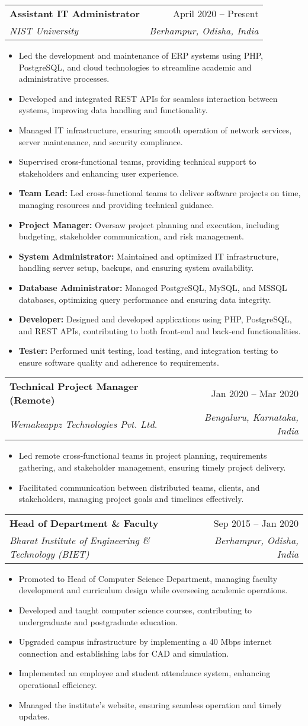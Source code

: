 \documentclass[letterpaper,11pt]{article}
\makeatletter
\newcommand{\resumeItem}[1]{
  \item\small{
    {#1 \vspace{-2pt}}
  }
}
\newcommand{\resumeSubheading}[4]{
  \vspace{-2pt}\item
    \begin{tabular*}{0.97\textwidth}[t]{l@{\extracolsep{\fill}}r}
      \textbf{#1} & #2 \\
      \textit{\small#3} & \textit{\small #4} \\
    \end{tabular*}\vspace{-7pt}
}
\newcommand{\resumeItemListStart}{\begin{itemize}}
\newcommand{\resumeItemListEnd}{\end{itemize}\vspace{-5pt}}
\makeatother
\begin{document}
\resumeSubheading
{Assistant IT Administrator}{April 2020 -- Present}
{NIST University}{Berhampur, Odisha, India}
\resumeItemListStart
    \resumeItem{Led the development and maintenance of ERP systems using PHP, PostgreSQL, and cloud technologies to streamline academic and administrative processes.}
    \resumeItem{Developed and integrated REST APIs for seamless interaction between systems, improving data handling and functionality.}
    \resumeItem{Managed IT infrastructure, ensuring smooth operation of network services, server maintenance, and security compliance.}
    \resumeItem{Supervised cross-functional teams, providing technical support to stakeholders and enhancing user experience.}
    \resumeItem{\textbf{Team Lead:} Led cross-functional teams to deliver software projects on time, managing resources and providing technical guidance.}
    \resumeItem{\textbf{Project Manager:} Oversaw project planning and execution, including budgeting, stakeholder communication, and risk management.}
    \resumeItem{\textbf{System Administrator:} Maintained and optimized IT infrastructure, handling server setup, backups, and ensuring system availability.}
    \resumeItem{\textbf{Database Administrator:} Managed PostgreSQL, MySQL, and MSSQL databases, optimizing query performance and ensuring data integrity.}
    \resumeItem{\textbf{Developer:} Designed and developed applications using PHP, PostgreSQL, and REST APIs, contributing to both front-end and back-end functionalities.}
    \resumeItem{\textbf{Tester:} Performed unit testing, load testing, and integration testing to ensure software quality and adherence to requirements.}
\resumeItemListEnd

\resumeSubheading
{Technical Project Manager (Remote)}{Jan 2020 -- Mar 2020}
{Wemakeappz Technologies Pvt. Ltd.}{Bengaluru, Karnataka, India}
\resumeItemListStart
    \resumeItem{Led remote cross-functional teams in project planning, requirements gathering, and stakeholder management, ensuring timely project delivery.}
    \resumeItem{Facilitated communication between distributed teams, clients, and stakeholders, managing project goals and timelines effectively.}
\resumeItemListEnd

\resumeSubheading
{Head of Department \& Faculty}{Sep 2015 -- Jan 2020}
{Bharat Institute of Engineering \& Technology (BIET)}{Berhampur, Odisha, India}
\resumeItemListStart
    \resumeItem{Promoted to Head of Computer Science Department, managing faculty development and curriculum design while overseeing academic operations.}
    \resumeItem{Developed and taught computer science courses, contributing to undergraduate and postgraduate education.}
    \resumeItem{Upgraded campus infrastructure by implementing a 40 Mbps internet connection and establishing labs for CAD and simulation.}
    \resumeItem{Implemented an employee and student attendance system, enhancing operational efficiency.}
    \resumeItem{Managed the institute’s website, ensuring seamless operation and timely updates.}
\resumeItemListEnd
\end{document}
